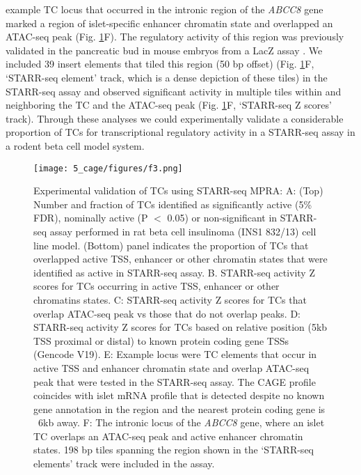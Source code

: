 example TC locus that occurred in the intronic region of the \textit{ABCC8} gene marked a region of islet-specific enhancer chromatin state and overlapped an ATAC-seq peak (Fig. \ref{fig:c5_f3}F). The regulatory activity of this region was previously validated in the pancreatic bud in mouse embryos from a LacZ assay \cite{parkerChromatinStretchEnhancer2013}. We included 39 insert elements that tiled this region (50 bp offset) (Fig. \ref{fig:c5_f3}F, ‘STARR-seq element’ track, which is a dense depiction of these tiles) in the STARR-seq assay and observed significant activity in multiple tiles within and neighboring the TC and the ATAC-seq peak (Fig. \ref{fig:c5_f3}F, ‘STARR-seq Z scores’ track). Through these analyses we could experimentally validate a considerable proportion of TCs for transcriptional regulatory activity in a STARR-seq assay in a rodent beta cell model system.   
   
\begin{figure}
        \centering
        \texttt{[image: 5\_cage/figures/f3.png]}
        \caption[Experimental validation of TCs using STARR-seq MPRA]{Experimental validation of TCs using STARR-seq MPRA: A: (Top) Number and fraction of TCs identified as significantly active (5\% FDR), nominally active (P $<$ 0.05) or non-significant in STARR-seq assay performed in rat beta cell insulinoma (INS1 832/13) cell line model. (Bottom) panel indicates the proportion of TCs that overlapped active TSS, enhancer or other chromatin states that were identified as active in STARR-seq assay. B. STARR-seq activity Z scores for TCs occurring in active TSS, enhancer or other chromatins states. C: STARR-seq activity Z scores for TCs that overlap ATAC-seq peak vs those that do not overlap peaks. D: STARR-seq activity Z scores for TCs based on relative position (5kb TSS proximal or distal) to known protein coding gene TSSs (Gencode V19). E: Example locus were TC elements that occur in active TSS and enhancer chromatin state and overlap ATAC-seq peak that were tested in the STARR-seq assay. The CAGE profile coincides with islet mRNA profile that is detected despite no known gene annotation in the region and the nearest protein coding gene is ~6kb away. F: The intronic locus of the \textit{ABCC8} gene, where an islet TC overlaps an ATAC-seq peak and active enhancer chromatin states. 198 bp tiles spanning the region shown in the ‘STARR-seq elements’ track were included in the assay.}
        \label{fig:c5_f3}
\end{figure}


